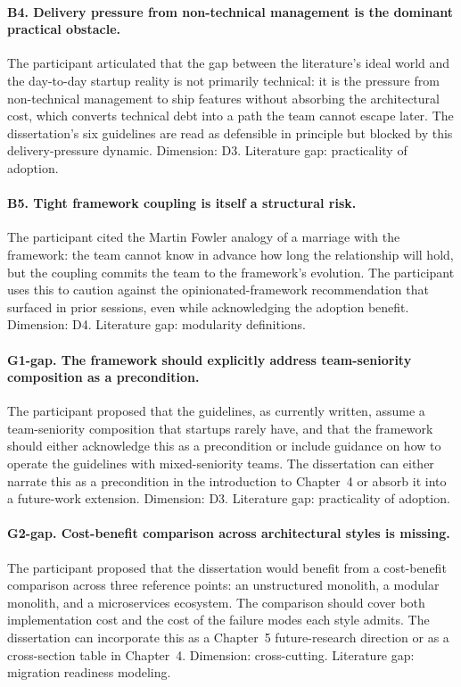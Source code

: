 \paragraph*{B4. Delivery pressure from non-technical management is the dominant practical obstacle.} The participant articulated that the gap between the literature's ideal world and the day-to-day startup reality is not primarily technical: it is the pressure from non-technical management to ship features without absorbing the architectural cost, which converts technical debt into a path the team cannot escape later. The dissertation's six guidelines are read as defensible in principle but blocked by this delivery-pressure dynamic. Dimension: D3. Literature gap: practicality of adoption.

\paragraph*{B5. Tight framework coupling is itself a structural risk.} The participant cited the Martin Fowler analogy of a marriage with the framework: the team cannot know in advance how long the relationship will hold, but the coupling commits the team to the framework's evolution. The participant uses this to caution against the opinionated-framework recommendation that surfaced in prior sessions, even while acknowledging the adoption benefit. Dimension: D4. Literature gap: modularity definitions.

\paragraph*{G1-gap. The framework should explicitly address team-seniority composition as a precondition.} The participant proposed that the guidelines, as currently written, assume a team-seniority composition that startups rarely have, and that the framework should either acknowledge this as a precondition or include guidance on how to operate the guidelines with mixed-seniority teams. The dissertation can either narrate this as a precondition in the introduction to Chapter~4 or absorb it into a future-work extension. Dimension: D3. Literature gap: practicality of adoption.

\paragraph*{G2-gap. Cost-benefit comparison across architectural styles is missing.} The participant proposed that the dissertation would benefit from a cost-benefit comparison across three reference points: an unstructured monolith, a modular monolith, and a microservices ecosystem. The comparison should cover both implementation cost and the cost of the failure modes each style admits. The dissertation can incorporate this as a Chapter~5 future-research direction or as a cross-section table in Chapter~4. Dimension: cross-cutting. Literature gap: migration readiness modeling.

